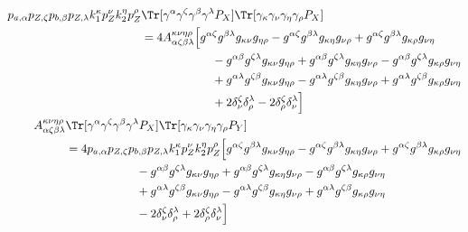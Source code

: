 \begin{align}
	\begin{split}
		p_{a,\alpha}p_{Z,\zeta}p_{b,\beta}p_{Z,\lambda}
		k_1^{\kappa}p_Z^{\nu}k_2^{\eta}p_Z^{\rho}
		&
		\Tr[\gamma^\alpha\gamma^\zeta\gamma^\beta\gamma^\lambda P_{X}]
		\Tr[\gamma_\kappa\gamma_\nu\gamma_\eta\gamma_\rho P_{X}]
		\\
		&=4A_{\alpha\zeta\beta\lambda}^{\kappa\nu\eta\rho}
		\Big[
			g^{\alpha\zeta}g^{\beta\lambda}g_{\kappa\nu}g_{\eta\rho}
			-g^{\alpha\zeta}g^{\beta\lambda}g_{\kappa\eta}g_{\nu\rho}
			+g^{\alpha\zeta}g^{\beta\lambda}g_{\kappa\rho}g_{\nu\eta}
			\\
			&\qquad\qquad\qquad
			-g^{\alpha\beta}g^{\zeta\lambda}g_{\kappa\nu}g_{\eta\rho}
			+g^{\alpha\beta}g^{\zeta\lambda}g_{\kappa\eta}g_{\nu\rho}
			-g^{\alpha\beta}g^{\zeta\lambda}g_{\kappa\rho}g_{\nu\eta}
			\\
			&\qquad\qquad\qquad
			+g^{\alpha\lambda}g^{\zeta\beta}g_{\kappa\nu}g_{\eta\rho}
			-g^{\alpha\lambda}g^{\zeta\beta}g_{\kappa\eta}g_{\nu\rho}
			+g^{\alpha\lambda}g^{\zeta\beta}g_{\kappa\rho}g_{\nu\eta}
			\\
			&\qquad\qquad\qquad
			+2\delta^\zeta_\nu\delta^\lambda_\rho
			-2\delta^\zeta_\rho\delta^\lambda_\nu
		\Big]
	\end{split}
	\\
	\begin{split}
		A_{\alpha\zeta\beta\lambda}^{\kappa\nu\eta\rho}
		&
		\Tr[\gamma^\alpha\gamma^\zeta\gamma^\beta\gamma^\lambda P_{X}]
		\Tr[\gamma_\kappa\gamma_\nu\gamma_\eta\gamma_\rho P_{Y}]
		\\
		&=4
		p_{a,\alpha}p_{Z,\zeta}p_{b,\beta}p_{Z,\lambda}
		k_1^{\kappa}p_Z^{\nu}k_2^{\eta}p_Z^{\rho}
		\Big[
			g^{\alpha\zeta}g^{\beta\lambda}g_{\kappa\nu}g_{\eta\rho}
			-g^{\alpha\zeta}g^{\beta\lambda}g_{\kappa\eta}g_{\nu\rho}
			+g^{\alpha\zeta}g^{\beta\lambda}g_{\kappa\rho}g_{\nu\eta}
			\\
			&\qquad\qquad\qquad
			-g^{\alpha\beta}g^{\zeta\lambda}g_{\kappa\nu}g_{\eta\rho}
			+g^{\alpha\beta}g^{\zeta\lambda}g_{\kappa\eta}g_{\nu\rho}
			-g^{\alpha\beta}g^{\zeta\lambda}g_{\kappa\rho}g_{\nu\eta}
			\\
			&\qquad\qquad\qquad
			+g^{\alpha\lambda}g^{\zeta\beta}g_{\kappa\nu}g_{\eta\rho}
			-g^{\alpha\lambda}g^{\zeta\beta}g_{\kappa\eta}g_{\nu\rho}
			+g^{\alpha\lambda}g^{\zeta\beta}g_{\kappa\rho}g_{\nu\eta}
			\\
			&\qquad\qquad\qquad
			-2\delta^\zeta_\nu\delta^\lambda_\rho
			+2\delta^\zeta_\rho\delta^\lambda_\nu
		\Big]
	\end{split}
\end{align}